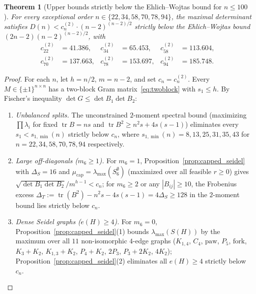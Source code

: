 \documentclass[11pt]{article}
\newtheorem{theorem}{Theorem}
\theoremstyle{remark}
\newcommand{\tr}{\operatorname{tr}}
\begin{document}
\begin{theorem}[Upper bounds strictly below the Ehlich--Wojtas bound for $n \le 100$]\label{thm:r2_all}
For every exceptional order $n \in \{22, 34, 58, 70, 78, 94\}$, the maximal determinant satisfies $D(n) < c_n^{(2)} \cdot (n - 2)^{(n-2)/2}$ strictly below the Ehlich--Wojtas bound $(2n - 2)(n - 2)^{(n-2)/2}$, with
\begin{align*}
  c_{22}^{(2)} &= 41.386, & c_{34}^{(2)} &= 65.453, & c_{58}^{(2)} &= 113.604, \\
  c_{70}^{(2)} &= 137.663, & c_{78}^{(2)} &= 153.697, & c_{94}^{(2)} &= 185.748.
\end{align*}
\end{theorem}

\begin{proof}
For each $n$, let $h = n/2$, $m = n - 2$, and set $c_n = c_n^{(2)}$. Every $M \in \{\pm 1\}^{n \times n}$ has a two-block Gram matrix~\eqref{eq:twoblock} with $s_1 \le h$. By Fischer's inequality $\det G \le \det B_1 \det B_2$:
\begin{enumerate}[leftmargin=*,topsep=2pt,itemsep=1pt]
\item \emph{Unbalanced splits.} The unconstrained $2$-moment spectral bound (maximizing $\prod \lambda_i$ for fixed $\tr B = n s$ and $\tr B^2 \ge n^2 s + 4 s(s-1)$) eliminates every $s_1 < s_{1,\min}(n)$ strictly below $c_n$, where $s_{1,\min}(n) = 8, 13, 25, 31, 35, 43$ for $n = 22, 34, 58, 70, 78, 94$ respectively.
\item \emph{Large off-diagonals ($m_6 \ge 1$).} For $m_6 = 1$, Proposition~\ref{prop:capped_seidel} with $\Delta_S = 16$ and $\mu_{\mathrm{cap}} = \lambda_{\max}(S_6^{\emptyset})$ (maximized over all feasible $r \ge 0$) gives $\sqrt{\det B_1 \det B_2} / m^{h-1} < c_n$; for $m_6 \ge 2$ or any $|B_{ij}| \ge 10$, the Frobenius excess $\Delta_T := \tr(B^2) - n^2 s - 4s(s-1) = 4\Delta_S \ge 128$ in the $2$-moment bound lies strictly below $c_n$.
\item \emph{Dense Seidel graphs ($e(H) \ge 4$).} For $m_6 = 0$, Proposition~\ref{prop:capped_seidel}(1) bounds $\lambda_{\max}(S(H))$ by the maximum over all $11$ non-isomorphic $4$-edge graphs ($K_{1,4}$, $C_4$, $\text{paw}$, $P_5$, $\text{fork}$, $K_3+K_2$, $K_{1,3}+K_2$, $P_4+K_2$, $2P_3$, $P_3+2K_2$, $4K_2$); Proposition~\ref{prop:capped_seidel}(2) eliminates all $e(H) \ge 4$ strictly below $c_n$.

\end{enumerate}
\end{proof}
\end{document}
